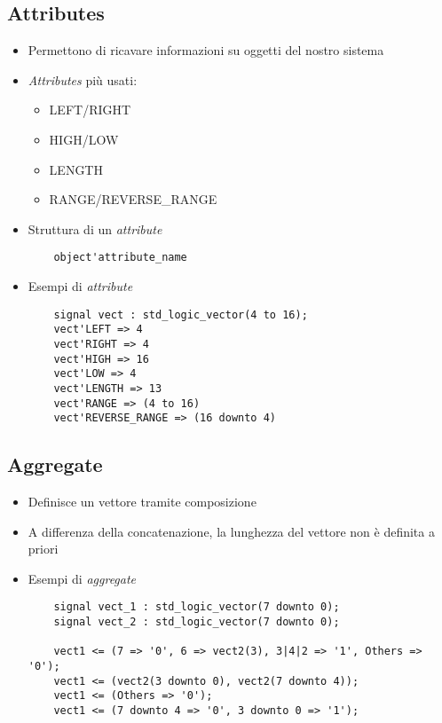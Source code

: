 \documentclass{article}
\begin{document}
\subsection{Attributes} \label{attributes}
\begin{itemize}
	\item Permettono di ricavare informazioni su oggetti del nostro sistema
	\item \textit{Attributes} più usati:
	      \begin{itemize}
	      	\item LEFT/RIGHT
	      	\item HIGH/LOW
	      	\item LENGTH
	      	\item RANGE/REVERSE\_RANGE
	      \end{itemize}
	      
\newpage

	\item Struttura di un \textit{attribute}
	      \begin{verbatim}
    object'attribute_name
	      \end{verbatim}
	\item Esempi di \textit{attribute}
	      \begin{verbatim}
    signal vect : std_logic_vector(4 to 16);
    vect'LEFT => 4
    vect'RIGHT => 4
    vect'HIGH => 16
    vect'LOW => 4
    vect'LENGTH => 13
    vect'RANGE => (4 to 16)
    vect'REVERSE_RANGE => (16 downto 4)
	      \end{verbatim}
\end{itemize}




\subsection{Aggregate} \label{aggregates}
\begin{itemize}
	\item Definisce un vettore tramite composizione
	\item A differenza della concatenazione, la lunghezza del vettore non è definita a priori

	\item Esempi di \textit{aggregate}
	      \begin{verbatim}
    signal vect_1 : std_logic_vector(7 downto 0);
    signal vect_2 : std_logic_vector(7 downto 0);
        
    vect1 <= (7 => '0', 6 => vect2(3), 3|4|2 => '1', Others => '0');
    vect1 <= (vect2(3 downto 0), vect2(7 downto 4));
    vect1 <= (Others => '0');
    vect1 <= (7 downto 4 => '0', 3 downto 0 => '1');
	      \end{verbatim}
\end{itemize}
\end{document}
